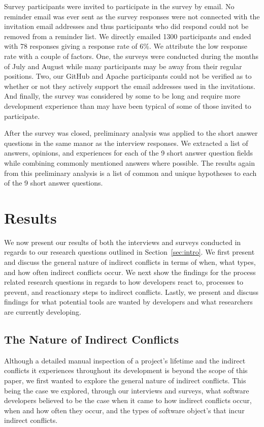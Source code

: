 \documentclass[conference]{IEEEtran}
\begin{document}
Survey participants were invited to participate in the survey by email. No reminder email was ever sent as the
survey responses were not connected with the invitation email addresses and thus participants who did respond
could not be removed from a reminder list. We directly emailed 1300 participants and ended with 78 responses
giving a response rate of 6\%. We attribute the low response rate with a couple of factors. One, the surveys
were conducted during the months of July and August while many participants may be away from their regular positions.
Two, our GitHub and Apache participants could not be verified as to whether or not they actively support the
email addresses used in the invitations. And finally, the survey was considered by some to be long and require
more development experience than may have been typical of some of those invited to participate.

After the survey was closed, preliminary analysis was applied to the short answer questions in the same manor
as the interview responses. We extracted a list of answers, opinions, and experiences for each of the 9 short
answer question fields while combining commonly mentioned answers where possible. The results again from this
preliminary analysis is a list of common and unique hypotheses to each of the 9 short answer questions.

\section{Results}
\label{sec:results}

We now present our results of both the interviews and surveys conducted in regards to our research questions
outlined in Section~\ref{sec:intro}. We first present and discuss the general nature of indirect conflicts in
terms of when, what types, and how often indirect conflicts occur. We next show the findings for the process
related research questions in regards to how developers react to, processes to prevent, and reactionary steps
to indirect conflicts. Lastly, we present and discuss findings for what potential tools are wanted by developers
and what researchers are currently developing.

\subsection{The Nature of Indirect Conflicts}

Although a detailed manual inspection of a project's lifetime and the indirect conflicts it experiences throughout
its development is beyond the scope of this paper, we first wanted to explore the general nature of indirect 
conflicts. This being the case we explored, through our interviews and surveys, what software developers believed
to be the case when it came to how indirect conflicts occur, when and how often they occur, and the types of 
software object's that incur indirect conflicts.
\end{document}
